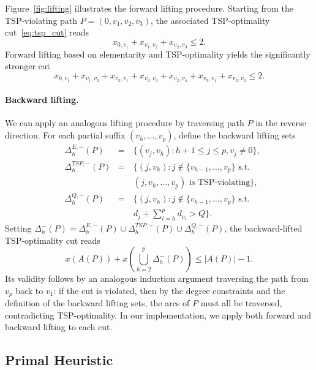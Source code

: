 \documentclass[a4paper,fleqn]{cas-dc}%
\begin{document}


Figure~\ref{fig:lifting} illustrates the forward lifting procedure. Starting from the TSP-violating path $P=(0, v_1, v_2, v_3)$, the associated TSP-optimality cut~\eqref{eq:tsp_cut} reads
\begin{equation*}
x_{0, v_1} + x_{v_1, v_2} + x_{v_2, v_3} \leq 2.
\end{equation*}
Forward lifting based on elementarity and TSP-optimality yields the significantly stronger cut
\begin{equation*}
x_{0, v_1} + x_{v_1, v_2} + x_{v_2, v_1} + x_{v_2, v_3} + x_{v_2, v_4} + x_{v_3, v_1} + x_{v_3, v_2} \leq 2.
\end{equation*}

\paragraph{Backward lifting.}
We can apply an analogous lifting procedure by traversing path $P$ in the reverse direction. For each partial suffix $(v_h, \ldots, v_p)$, define the backward lifting sets
\begin{align*}
  &\Delta^{E,-}_{h}(P) &=~& \big\{(v_j, v_h) : h+1 \leq j \leq p, v_j \neq 0 \big\}, \\[4pt]
  &\Delta^{TSP,-}_{h}(P) &=~& \big\{(j, v_h) : j\notin \{v_{h-1},\ldots,v_p\} \text{ s.t.} \\
  &&& (j, v_h, \ldots, v_p)\text{ is TSP-violating} \big\}, \\[4pt]
  &\Delta^{Q,-}_{h}(P) &=~& \big\{(j, v_h) : j\notin \{v_{h-1},\ldots,v_p\} \text{ s.t.} \\
  &&& d_j + \textstyle\sum_{i=h}^{p} d_{v_i} > Q \big\}.
\end{align*}
Setting $\Delta^{-}_{h}(P) = \Delta^{E,-}_{h}(P) \cup \Delta^{TSP,-}_{h}(P) \cup \Delta^{Q,-}_{h}(P)$, the backward-lifted TSP-optimality cut reads
\begin{equation}
x(A(P)) + x\!\left(\bigcup_{h=2}^{p} \Delta^{-}_{h}(P)\right) \leq |A(P)| - 1. \label{eq:backward_lifted_cut}
\end{equation}
Its validity follows by an analogous induction argument traversing the path from $v_p$ back to $v_1$: if the cut is violated, then by the degree constraints and the definition of the backward lifting sets, the arcs of $P$ must all be traversed, contradicting TSP-optimality. In our implementation, we apply both forward and backward lifting to each cut.

\subsection{Primal Heuristic}
\label{subsec:primal}
\end{document}
